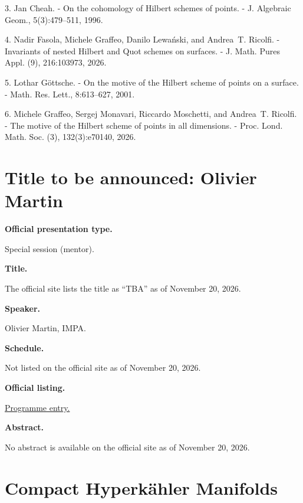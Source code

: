 3. Jan Cheah. - On the cohomology of
{H}ilbert schemes of points. - J. Algebraic
Geom., 5(3):479--511, 1996.

4. Nadir Fasola, Michele Graffeo, Danilo
Lewański, and Andrea~T. Ricolfi. - Invariants
of nested Hilbert and Quot schemes on
surfaces. - J. Math. Pures Appl. (9),
216:103973, 2026.

5. Lothar G{\"{o}}ttsche. - On the motive of
the Hilbert scheme of points on a surface. -
Math. Res. Lett., 8:613--627, 2001.

6. Michele Graffeo, Sergej Monavari, Riccardo
Moschetti, and Andrea~T. Ricolfi. - The
motive of the Hilbert scheme of points in all
dimensions. - Proc. Lond. Math. Soc. (3),
132(3):e70140, 2026.

\section{Title to be announced: Olivier
Martin}
\label{section-tba-martin}

\medskip\noindent
{\bf Official presentation type.}

Special session (mentor).

\medskip\noindent
{\bf Title.}

The official site lists the title as
``TBA'' as of November 20, 2026.

\medskip\noindent
{\bf Speaker.}

Olivier Martin, IMPA.

\medskip\noindent
{\bf Schedule.}

Not listed on the official site as of
November 20, 2026.

\medskip\noindent
{\bf Official listing.}

\href{%
https://sites.google.com/view/%
geoalgcompluff/legal/%
legal-2027-resumos#h.6f5k7zdb7c47%
}{Programme entry.}

\medskip\noindent
{\bf Abstract.}

No abstract is available on the
official site as of November 20, 2026.

\section{Compact Hyperkähler Manifolds}
\label{section-compact-hyperkahler-manifolds}

